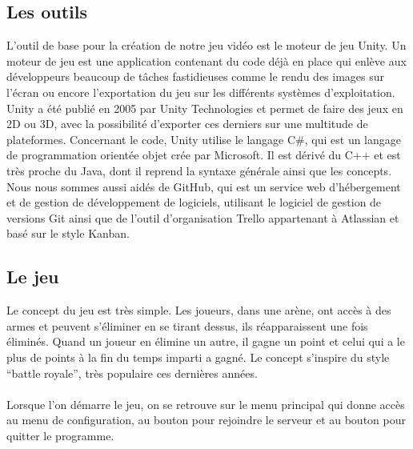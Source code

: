 \documentclass[a4paper]{article}
\begin{document}
\subsection{Les outils}
L’outil de base pour la création de notre jeu vidéo est le moteur de jeu Unity. Un moteur de jeu est une application contenant du code déjà en place qui enlève aux développeurs beaucoup de tâches fastidieuses comme le rendu des images sur l’écran ou encore l’exportation du jeu sur les différents systèmes d’exploitation. Unity a été publié en 2005 par Unity Technologies et permet de faire des jeux en 2D ou 3D, avec la possibilité d’exporter ces derniers sur une multitude de plateformes. Concernant le code, Unity utilise le langage C\#, qui est un langage de programmation orientée objet crée par Microsoft. Il est dérivé du C++ et est très proche du Java, dont il reprend la syntaxe générale ainsi que les concepts. Nous nous sommes aussi aidés de GitHub, qui est un service web d'hébergement et de gestion de développement de logiciels, utilisant le logiciel de gestion de versions Git \cite{git} ainsi que de l'outil d'organisation Trello \cite{trello} appartenant à Atlassian et basé sur le style Kanban.

\subsection{Le jeu}
Le concept du jeu est très simple. Les joueurs, dans une arène, ont accès à des armes et peuvent s’éliminer en se tirant dessus, ils réapparaissent une fois éliminés. Quand un joueur en élimine un autre, il gagne un point et celui qui a le plus de points à la fin du temps imparti a gagné. Le concept s'inspire du style   ``battle royale'', très populaire ces dernières années. \\
\\
Lorsque l'on démarre le jeu, on se retrouve sur le menu principal qui donne accès au menu de configuration, au bouton pour rejoindre le serveur et au bouton pour quitter le programme.
\end{document}
